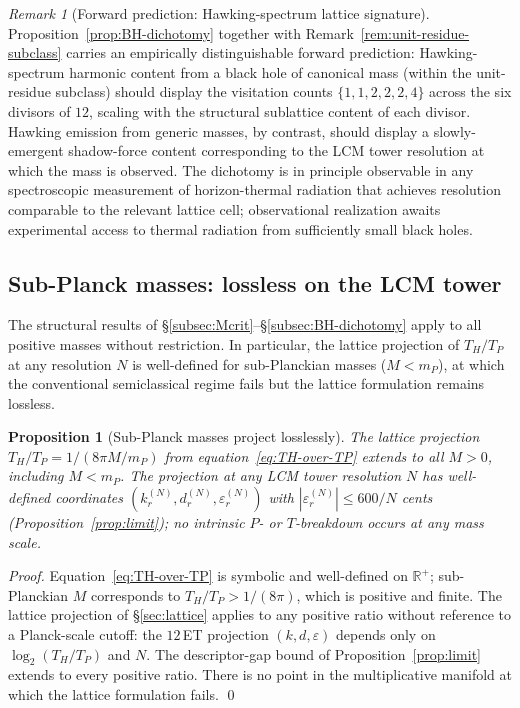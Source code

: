 \documentclass[11pt,a4paper]{article}
\newtheorem{proposition}[theorem]{Proposition}
\theoremstyle{definition}
\theoremstyle{remark}
\newtheorem{remark}[theorem]{Remark}
\begin{document}
\begin{remark}[Forward prediction: Hawking-spectrum lattice signature]\label{rem:BH-prediction}
Proposition~\ref{prop:BH-dichotomy} together with Remark~\ref{rem:unit-residue-subclass} carries an empirically distinguishable forward prediction: Hawking-spectrum harmonic content from a black hole of canonical mass (within the unit-residue subclass) should display the visitation counts $\{1,1,2,2,2,4\}$ across the six divisors of $12$, scaling with the structural sublattice content of each divisor. Hawking emission from generic masses, by contrast, should display a slowly-emergent shadow-force content corresponding to the LCM tower resolution at which the mass is observed. The dichotomy is in principle observable in any spectroscopic measurement of horizon-thermal radiation that achieves resolution comparable to the relevant lattice cell; observational realization awaits experimental access to thermal radiation from sufficiently small black holes.
\end{remark}

\subsection{Sub-Planck masses: lossless on the LCM tower}\label{subsec:subplanck}

The structural results of \S\ref{subsec:Mcrit}--\S\ref{subsec:BH-dichotomy} apply to all positive masses without restriction. In particular, the lattice projection of $T_{H}/T_{P}$ at any resolution $N$ is well-defined for sub-Planckian masses ($M < m_{P}$), at which the conventional semiclassical regime fails but the lattice formulation remains lossless.

\begin{proposition}[Sub-Planck masses project losslessly]\label{prop:subplanck-lossless}
The lattice projection $T_{H}/T_{P} = 1/(8\pi M/m_{P})$ from equation~\eqref{eq:TH-over-TP} extends to all $M > 0$, including $M < m_{P}$. The projection at any LCM tower resolution $N$ has well-defined coordinates $(k_{r}^{(N)}, d_{r}^{(N)}, \varepsilon_{r}^{(N)})$ with $|\varepsilon_{r}^{(N)}| \le 600/N$ cents (Proposition~\ref{prop:limit}); no intrinsic $P$- or $T$-breakdown occurs at any mass scale.
\end{proposition}

\begin{proof}
Equation~\eqref{eq:TH-over-TP} is symbolic and well-defined on $\mathbb{R}^{+}$; sub-Planckian $M$ corresponds to $T_{H}/T_{P} > 1/(8\pi)$, which is positive and finite. The lattice projection of \S\ref{sec:lattice} applies to any positive ratio without reference to a Planck-scale cutoff: the $12$\,ET projection $(k,d,\varepsilon)$ depends only on $\log_{2}(T_{H}/T_{P})$ and $N$. The descriptor-gap bound of Proposition~\ref{prop:limit} extends to every positive ratio. There is no point in the multiplicative manifold at which the lattice formulation fails. \qed
\end{proof}
\end{document}
